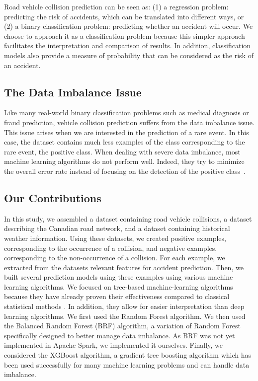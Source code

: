 \documentclass[conference]{IEEEtran}
\begin{document}
Road vehicle collision prediction can be seen as: 
(1) a regression problem: predicting the risk of accidents, which can be translated into different ways, or 
(2) a binary classification problem: predicting whether an accident will occur. 
We choose to approach it as a classification problem because this simpler approach facilitates the interpretation and comparison of results.
In addition, classification models also provide a measure of probability that can be considered as the risk of an accident.


\subsection{The Data Imbalance Issue}

Like many real-world binary classification problems such as medical diagnosis or fraud prediction, vehicle collision prediction suffers from the data imbalance issue. This issue arises when we are interested in the prediction of a rare event. In this case, the dataset contains much less examples of the class corresponding to the rare event, the positive class. When dealing with severe data imbalance, most machine learning algorithms do not perform well. Indeed, they try to minimize the overall error rate instead of focusing on the detection of the positive class~\cite{Chen2004}.


\subsection{Our Contributions}

In this study, we assembled a dataset containing road vehicle collisions, a dataset describing the Canadian road network, and a dataset containing historical weather information. Using these datasets, we created positive examples, corresponding to the occurrence of a collision, and negative examples, corresponding to the non-occurrence of a collision. For each example, we extracted from the datasets relevant features for accident prediction. Then, we built several prediction models using these examples using various machine learning algorithms. 
We focused on tree-based machine-learning algorithms because they have already proven their effectiveness compared to classical statistical methods \cite{Chang2005, Chang2005b}. In addition, they allow for easier interpretation than deep learning algorithms. We first used the Random Forest algorithm\cite{Breiman2001}. 
We then used the Balanced Random Forest (BRF) algorithm\cite{Chen2004}, a variation of Random Forest specifically designed to better manage data imbalance. 
As BRF was not yet implemented in Apache Spark, we implemented it ourselves. Finally, we considered the XGBoost algorithm\cite{TChen2016}, a gradient tree boosting algorithm which has been used successfully for many machine learning problems and can handle data imbalance\cite{xgboost_doc}.
\end{document}
